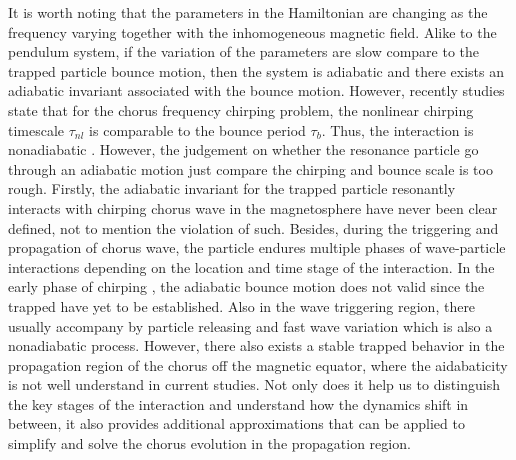 It is worth noting that the parameters in the Hamiltonian are changing as the frequency varying together with the inhomogeneous magnetic field.
Alike to the pendulum system, if the variation of the parameters are slow compare to the trapped particle bounce motion, then the system is adiabatic and there exists an adiabatic invariant associated with the bounce motion.
However, recently studies state that for the chorus frequency chirping problem, the nonlinear chirping timescale $\tau_{nl}$ is comparable to the bounce period $\tau_{b}$. Thus, the interaction is nonadiabatic \cite{tao2017a,tao2017b}. 
However, the judgement on whether the resonance particle go through an adiabatic motion just compare the chirping and bounce scale is too rough.
Firstly, the adiabatic invariant for the trapped particle resonantly interacts with chirping chorus wave in the magnetosphere have never been clear defined, not to mention the violation of such.
Besides, during the triggering and propagation of chorus wave, the particle endures multiple phases of wave-particle interactions depending on the location and time stage of the interaction.
In the early phase of chirping \cite{bierwage2021}, the adiabatic bounce motion does not valid since the trapped have yet to be established.
Also in the wave triggering region, there usually accompany by particle releasing \cite{tao_trap-release-amplify_2021} and fast wave variation which is also a nonadiabatic process.
However, there also exists a stable trapped behavior \cite{zheng2024} in the propagation region of the chorus off the magnetic equator, where the aidabaticity is not well understand in current studies. 
Not only does it help us to distinguish the key stages of the interaction and understand how the dynamics shift in between, it also provides additional approximations that can be applied to simplify and solve the chorus evolution in the propagation region.

